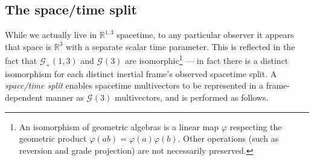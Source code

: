 \documentclass[12pt,a4paper]{article}
\newcommand{\GA}[1][]{\mathcal{G}_{#1}}
\newcommand{\RR}{\mathds{R}}
\begin{document}
\subsection{The space/time split}

While we actually live in $\RR^{1,3}$ spacetime, to any particular observer it appears that space is $\RR^3$ with a separate scalar time parameter.
This is reflected in the fact that $\GA[+](1,3)$ and $\GA(3)$ are isomorphic\footnote{
	An isomorphism of geometric algebras is a linear map $\varphi{}$ respecting the geometric product $\varphi{}(ab) = \varphi{}(a)\varphi{}(b)$.
	Other operations (such as reversion and grade projection) are not necessarily preserved.
} --- in fact there is a distinct isomorphism for each distinct inertial frame's observed spacetime split.
A \emph{space/time split} enables spacetime multivectors to be represented in a frame-dependent manner as $\GA(3)$ multivectors, and is performed as follows.
\end{document}
